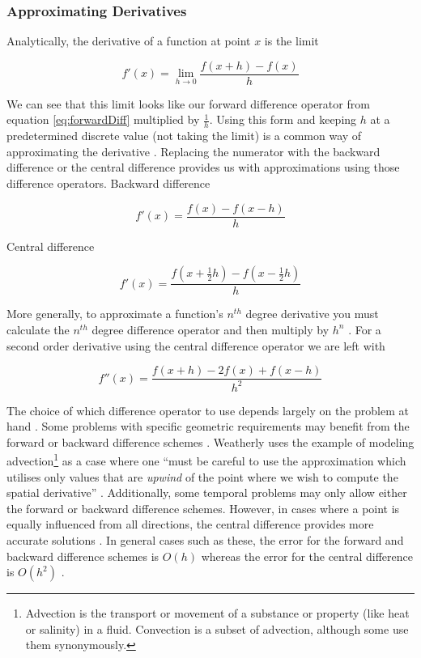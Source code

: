 \documentclass[authoryearcitations]{UoYCSproject}
\begin{document}
\subsubsection{Approximating Derivatives} 
Analytically, the derivative of a function at point $x$ is the limit

\begin{equation}
  f'(x) = \lim_{h\to0} \frac{f(x + h) - f(x)}{h} \nonumber
\end{equation}

We can see that this limit looks like our forward difference operator from equation \ref{eq:forwardDiff} multiplied
by $\frac{1}{h}$. Using this form and keeping $h$ at a predetermined discrete value (not taking the limit)
is a common way of approximating the derivative \cite{Hamming, wolfram, zhilin}. Replacing the numerator with
the backward difference or the central difference provides us with approximations using those difference operators. 
Backward difference

$$f'(x) = \frac{f(x) - f(x - h)}{h} $$

Central difference

$$f'(x) = \frac{f(x + \frac{1}{2}h) - f(x - \frac{1}{2}h)}{h} $$

More generally, to approximate a function's $n^{th}$ degree derivative you must calculate the $n^{th}$ degree
difference operator and then multiply by $h^n$ \cite{Hamming, weatherley4}. For a second order derivative using
the central difference operator we are left with

\begin{equation}
f''(x) = \frac{f(x + h) - 2f(x) + f(x - h)}{h^2}
\label{eq:2ndDegreeDiffOp}
\end{equation}

The choice of which difference operator to use depends largely on the problem at hand \cite{Hamming, weatherley}. 
Some problems with specific geometric requirements may benefit from the forward or backward difference schemes \cite{weatherley}.
Weatherly uses the example of modeling advection\footnote{Advection is the transport or movement of a substance or property
(like heat or salinity) in a fluid. Convection is a subset of advection, although some use them synonymously.} as a case
where one ``must be careful to use the approximation which utilises only values that are \emph{upwind} of the point where
we wish to compute the spatial derivative'' \cite{weatherley4}. Additionally, some temporal problems may only allow
either the forward or backward difference schemes. However, in cases where a point is equally influenced
from all directions, the central difference provides more accurate solutions \cite{Hamming, weatherley, weatherley4, analysis}.
In general cases such as these, the error for the forward and backward difference schemes is $O(h)$ whereas the error 
for the central difference is $O(h^2)$ \cite{analysis, weatherley}. 
\end{document}
